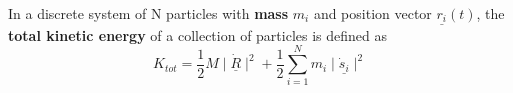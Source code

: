 \begin{definition}
	In a discrete system of N particles with {\bf mass} $m_i$ and position vector $\underline{r_i}\left(t  \right) $, the {\bf total kinetic energy} of a collection of particles is defined as
	\begin{equation}
		\label{eq:total-kinetic-energy-2}
    K_{tot} = \frac{1}{2}M\mid\underline{\dot{R}} \mid^{2} + \frac{1}{2}\sum_{i=1}^{N}m_{i}\mid \underline{\dot{s}_{i}}\mid^{2}
	\end{equation}

\end{definition}

\clearpage
